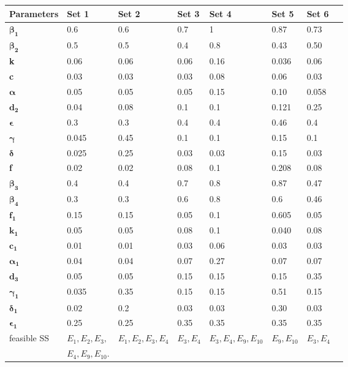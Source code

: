 \begin{table}
\centering
    \begin{tabular}{|p{1.9cm}|p{1.8cm}|p{1.8cm}|p{1.8cm}|p{1.8cm}|p{1.8cm}|p{1.8cm}|p{1.8cm}|}
    \hline
               Parameters      & \textbf{Set 1} & \textbf{Set 2} & \textbf{Set 3} & \textbf{Set 4} & \textbf{Set 5} & \textbf{Set 6} \\
            \hline
  $\boldsymbol {\beta_{1}} $                 & 0.6 & 0.6 & 0.7 & 1 & 0.87 & 0.73  \\
  $\boldsymbol {\beta_{2}} $     & 0.5 & 0.5 & 0.4 & 0.8 & 0.43 & 0.50 \\
  \textbf {k}      & 0.06 & 0.06 & 0.06 & 0.16 & 0.036 & 0.06\\
  \textbf{c}               & 0.03 & 0.03 & 0.03 & 0.08 & 0.06 & 0.03\\
  $\boldsymbol{\alpha}$         & 0.05 & 0.05 & 0.05 & 0.15 & 0.10 & 0.058 \\
  $\mathbf {d _{2} }$          & 0.04 & 0.08 & 0.1 & 0.1 & 0.121 & 0.25 \\
  $\boldsymbol{\epsilon}$         & 0.3 & 0.3 & 0.4 & 0.4 & 0.46 & 0.4 \\
  $\boldsymbol{\gamma}$                & 0.045 & 0.45 & 0.1 & 0.1 & 0.15 & 0.1\\
  $\boldsymbol{\delta}$       & 0.025 & 0.25 & 0.03 & 0.03 & 0.15 & 0.03 \\
  \textbf{f}          & 0.02 & 0.02 & 0.08 & 0.1 & 0.208 & 0.08\\
  $\boldsymbol {\beta_{3}}$         & 0.4 & 0.4 & 0.7 & 0.8 & 0.87 & 0.47 \\
  $\boldsymbol {\beta_{4}}$            & 0.3 & 0.3 & 0.6 & 0.8 & 0.6 & 0.46\\
  $\mathbf{f_{1} } $        & 0.15 & 0.15 & 0.05 & 0.1 & 0.605 & 0.05\\
  $\mathbf{k_{1} }  $       & 0.05 & 0.05& 0.08& 0.1& 0.040& 0.08\\
  $\mathbf{c_{1} } $        & 0.01 & 0.01 & 0.03 & 0.06 & 0.03 & 0.03\\
  $\boldsymbol {\alpha_{1}}$         & 0.04 & 0.04 & 0.07& 0.27 & 0.07 & 0.07\\
  $\mathbf{d_{3}}$         & 0.05 & 0.05 & 0.15& 0.15 & 0.15 & 0.35\\
  $\boldsymbol {\gamma_{1}}$         & 0.035 & 0.35 & 0.15& 0.15 & 0.51 & 0.15\\
  $\boldsymbol {\delta_{1}}$        & 0.02 & 0.2 & 0.03& 0.03 & 0.30 & 0.03\\
  $\boldsymbol {\epsilon_{1}}$         & 0.25 & 0.25 & 0.35& 0.35 & 0.35 & 0.35\\
  \hline
 \multirow{1}{4cm}{\small feasible SS}   &\scriptsize $E_{1},E_{2},E_{3},$ &\scriptsize $E_{1},E_{2},E_{3},E_{4}$ & \scriptsize $E_{3},E_{4}$ & \scriptsize $E_{3},E_{4},E_{9},E_{10}$ & \scriptsize $E_{9},E_{10}$ & \scriptsize $E_{3},E_{4}$  \\
 & \scriptsize$E_{4},E_{9},E_{10}$. & & & & & \\


\end{tabular}
\end{table}
